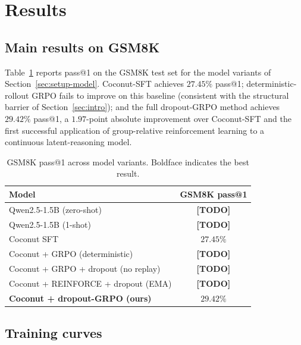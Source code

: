 \documentclass[11pt]{article}
\theoremstyle{definition}
\theoremstyle{remark}
\newcommand{\answerTODO}[1][]{{\color{red}\textbf{[TODO}#1\textbf{]}}}
\begin{document}
\section{Results}
\label{sec:results}

\subsection{Main results on GSM8K}
\label{sec:results-main}

Table~\ref{tab:main} reports pass@1 on the \textsc{GSM8K} test set for
the model variants of Section~\ref{sec:setup-model}.  Coconut-SFT
achieves $27.45\%$ pass@1; deterministic-rollout GRPO fails to
improve on this baseline (consistent with the structural barrier of
Section~\ref{sec:intro}); and the full dropout-GRPO method achieves
$29.42\%$ pass@1, a $1.97$-point absolute improvement over Coconut-SFT
and the first successful application of group-relative reinforcement
learning to a continuous latent-reasoning model.

\begin{table}[h]
\centering
\caption{\textsc{GSM8K} pass@1 across model variants.  Boldface
         indicates the best result.}
\label{tab:main}
\begin{tabular}{lc}
\toprule
Model & GSM8K pass@1 \\
\midrule
Qwen2.5-1.5B (zero-shot)             & \answerTODO{} \\
Qwen2.5-1.5B (1-shot)                & \answerTODO{} \\
Coconut SFT                          & $27.45\%$ \\
Coconut + GRPO (deterministic)       & \answerTODO{} \\
Coconut + GRPO + dropout (no replay) & \answerTODO{} \\
Coconut + REINFORCE + dropout (EMA)  & \answerTODO{} \\
\textbf{Coconut + dropout-GRPO (ours)} & $\mathbf{29.42\%}$ \\
\bottomrule
\end{tabular}
\end{table}

\subsection{Training curves}
\label{sec:results-curves}
\end{document}
